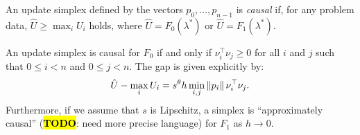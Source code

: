 \documentclass[sisc-eikonal.tex]{subfiles}
\begin{document}
\begin{definition}
  An update simplex defined by the vectors $p_0, \hdots, p_{n-1}$ is
  \emph{causal} if, for any problem data, $\hat{U} \geq \max_i U_i$
  holds, where $\hat{U} = F_0(\lambda^*)$ or
  $\hat{U} = F_1(\lambda^*)$.
\end{definition}

\begin{theorem}\label{thm:causality}
  An update simplex is causal for $F_0$ if and only if
  $\nu_i^\top \nu_j \geq 0$ for all $i$ and $j$ such that $0 \leq i < n$
  and $0 \leq j < n$. The gap is given explicitly by:
  \begin{equation}
    \hat{U} - \max_i U_i = s^\theta h \min_{i, j} \left\|p_i\right\| \nu_i^\top \nu_j.
  \end{equation}
  Furthermore, if we assume that $s$ is Lipschitz, a simplex is
  ``approximately causal'' (\hl{\textbf{TODO}}: need more precise
  language) for $F_1$ as $h \to 0$.
\end{theorem}
\end{document}
